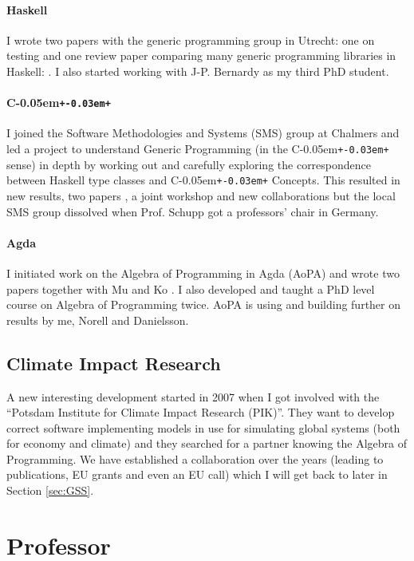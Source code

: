 \documentclass[11pt,twoside,twocolumn]{article}
\providecommand{\cpp}{C\kern-0.05em\texttt{+\kern-0.03em+}}
\providecommand{\Cpp}{\cpp}
\begin{document}
\paragraph{Haskell} I wrote two papers with the generic programming
group in Utrecht: one on testing \citep{janssonjeuring2007:Testing} and
one review paper comparing many generic programming libraries in Haskell:
\citep{Rodriguezetal2008:CompGenLib}.
%
I also started working with J-P. Bernardy as my third PhD student.


\paragraph{\Cpp} I joined the Software Methodologies and Systems (SMS)
group at Chalmers and led a project to understand Generic Programming
(in the \Cpp{} sense) in depth by working out and carefully exploring the
correspondence between Haskell type classes and \Cpp{} Concepts.
%
This resulted in new results, two papers \citep{SMS-Bernardy:2008:CCC,
  bernardy_generic_2010}, a joint workshop \citep{wgp09proceedings} and
new collaborations but the local SMS group dissolved when Prof. Schupp got a
professors' chair in Germany.

\paragraph{Agda} I initiated work on the Algebra of Programming in
Agda (AoPA) and wrote two papers together with Mu and Ko
\citep{mukojansson08:mpc:dcc, MuKoJansson2009AoPA}.
%
I also developed and taught a PhD level course on Algebra of
Programming twice.
%
AoPA is using and building further on results by me, Norell and
Danielsson.
%

\subsection{Climate Impact Research}
A new interesting development started in 2007 when I got involved with
the ``Potsdam Institute for Climate Impact Research (PIK)''.
%
They want to develop correct software implementing models in use for
simulating global systems (both for economy and climate) and they
searched for a partner knowing the Algebra of Programming.
%
We have established a collaboration over the years (leading to
publications, EU grants and even an EU call) which I will get back to
later in Section \ref{sec:GSS}.


\section{Professor}
\end{document}
